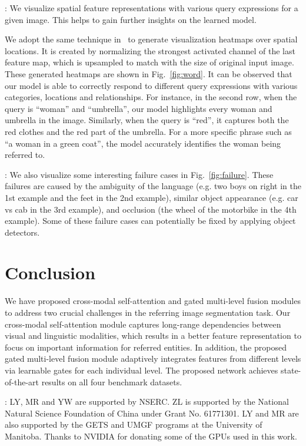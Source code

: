 \documentclass[10pt,twocolumn,letterpaper]{article}
\begin{document}
: We visualize spatial feature representations with various query expressions for a given image. This helps to gain further insights on the learned model. 

We adopt the same technique in~\cite{li2018referring} to generate visualization heatmaps over spatial locations. It is created by normalizing the strongest activated channel of the last feature map, which is upsampled to match with the size of original input image. These generated heatmaps are shown in Fig.~\ref{fig:word}. It can be observed that our model is able to correctly respond to different query expressions with various categories, locations and relationships. For instance, in the second row, when the query is ``woman'' and ``umbrella'', our model highlights every woman and umbrella in the image. Similarly, when the query is ``red'', it captures both the red clothes and the red part of the umbrella. For a more specific phrase such as ``a woman in a green coat'', the model accurately identifies the woman being referred to. 



: We also visualize some interesting failure cases in Fig.~\ref{fig:failure}. These failures are caused by the ambiguity of the language (e.g. two boys on right in the 1st example and the feet in the 2nd example), similar object appearance (e.g. car vs cab in the 3rd example), and occlusion (the wheel of the motorbike in the 4th example). Some of these failure cases can potentially be fixed by applying object detectors.

 \section{Conclusion}
We have proposed cross-modal self-attention and gated multi-level fusion modules to address two crucial challenges in the referring image segmentation task. Our cross-modal self-attention module captures long-range dependencies between visual and linguistic modalities, which results in a better feature representation to focus on important information for referred entities. In addition, the proposed gated multi-level fusion module adaptively integrates features from different levels via learnable gates for each individual level. The proposed network achieves state-of-the-art results on all four benchmark datasets.

: LY, MR and YW are supported by NSERC. ZL is supported by the National Natural Science Foundation of China under Grant No. 61771301. LY and MR are also supported by the GETS and UMGF programs at the University of Manitoba. Thanks to NVIDIA for donating some of the GPUs used in this work.






 









{\small


}
\end{document}
